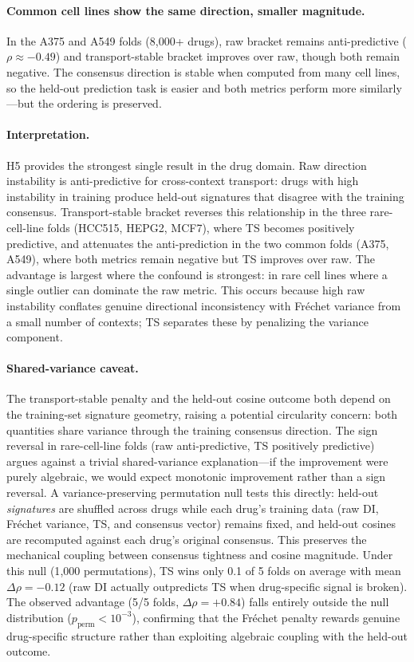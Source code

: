 \documentclass{article}
\begin{document}
\paragraph{Common cell lines show the same direction, smaller magnitude.}
In the A375 and A549 folds (8{,}000+ drugs), raw bracket remains
anti-predictive ($\rho \approx -0.49$) and transport-stable bracket
improves over raw, though both remain negative. The consensus direction
is stable when computed from many cell lines, so the held-out prediction
task is easier and both metrics perform more similarly---but the ordering
is preserved.

\paragraph{Interpretation.}
H5 provides the strongest single result in the drug domain. Raw direction
instability is anti-predictive for cross-context transport: drugs with high
instability in training produce held-out signatures that disagree with the
training consensus. Transport-stable bracket reverses this relationship in
the three rare-cell-line folds (HCC515, HEPG2, MCF7), where TS becomes
positively predictive, and attenuates the anti-prediction in the two common
folds (A375, A549), where both metrics remain negative but TS improves over
raw. The advantage is largest where the confound is strongest: in rare cell
lines where a single outlier can dominate the raw metric. This occurs
because high raw instability conflates genuine directional inconsistency
with Fr\'{e}chet variance from a small number of contexts; TS separates
these by penalizing the variance component.

\paragraph{Shared-variance caveat.}
The transport-stable penalty and the held-out cosine outcome both depend on
the training-set signature geometry, raising a potential circularity concern:
both quantities share variance through the training consensus direction.
The sign reversal in rare-cell-line folds (raw anti-predictive, TS
positively predictive) argues against a trivial shared-variance
explanation---if the improvement were purely algebraic,
we would expect monotonic improvement rather than a sign reversal. A
variance-preserving permutation null tests this directly: held-out
\emph{signatures} are shuffled across drugs while each drug's training
data (raw DI, Fr\'echet variance, TS, and consensus vector) remains
fixed, and held-out cosines are recomputed against each drug's original
consensus. This preserves the mechanical coupling between consensus
tightness and cosine magnitude. Under this null (1{,}000 permutations),
TS wins only 0.1 of 5 folds on average with mean $\Delta\rho = -0.12$
(raw DI actually outpredicts TS when drug-specific signal is broken).
The observed advantage (5/5 folds, $\Delta\rho = +0.84$) falls entirely
outside the null distribution ($p_{\text{perm}} < 10^{-3}$), confirming
that the Fr\'echet penalty rewards genuine drug-specific structure rather
than exploiting algebraic coupling with the held-out outcome.
\end{document}
